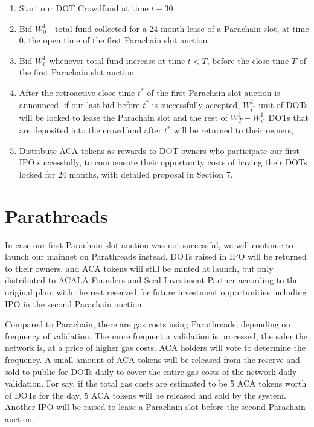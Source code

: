 \documentclass{article}
\begin{document}
    \begin{enumerate}
    \item Start our DOT Crowdfund at time $t-30$  
    \item Bid $W^1_0$ - total fund collected for a 24-month lease of a Parachain slot, at time $0$, the open time of the first Parachain slot auction
    \item Bid $W^1_t$ whenever total fund increase at time $t<T$, before the close time $T$ of the first Parachain slot auction
    \item After the retroactive close time $t^*$ of the first Parachain slot auction is announced, if our last bid before $t^*$ is successfully accepted, $W^1_{t^*}$  unit of DOTs will be locked to lease the Parachain slot and the rest of $W^1_{T} - W^1_{t^*}$ DOTs that are deposited into the crowdfund after $t^*$ will be returned to their owners,
    \item Distribute ACA tokens as rewards to DOT owners who participate our first IPO successfully, to compensate their opportunity costs of having their DOTs locked for 24 months, with detailed proposal in Section 7. 
    \end{enumerate}


\section{Parathreads}
In case our first Parachain slot auction was not successful, we will continue to launch our mainnet on Parathreads instead. DOTs raised in IPO will be returned to their owners, and ACA tokens will still be minted at launch, but only distributed to ACALA Founders and Seed Investment Partner according to the original plan, with the rest reserved for future investment opportunities including IPO in the second Parachain auction. 

Compared to Parachain, there are gas costs using Parathreads, depending on frequency of validation. The more frequent a validation is processed, the safer the network is, at a price of higher gas costs. ACA holders will vote to determine the frequency. A small amount of ACA tokens will be released from the reserve and sold to public for DOTs daily to cover the entire gas costs of the network daily validation. For say, if the total gas costs are estimated to be 5 ACA tokens worth of DOTs for the day, 5 ACA tokens will be released and sold by the system. Another IPO will be raised to lease a Parachain slot before the second Parachain auction. 
\end{document}
